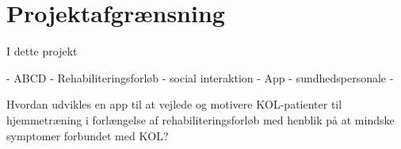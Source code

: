 \section{Projektafgrænsning}
I dette projekt 

- ABCD
- Rehabiliteringsforløb
- social interaktion
- App
- sundhedspersonale
- 


Hvordan udvikles en app til at vejlede og motivere KOL-patienter til hjemmetræning i
forlængelse af rehabiliteringsforløb med henblik på at mindske symptomer forbundet med
KOL?